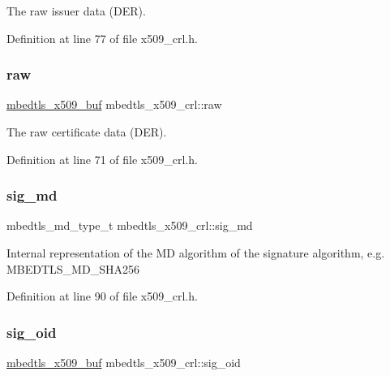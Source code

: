 The raw issuer data (D\+ER). 

Definition at line 77 of file x509\+\_\+crl.\+h.

\mbox{\label{structmbedtls__x509__crl_a6fb756d2b65237ccaff6061f4217b2eb}} 
\subsubsection{\texorpdfstring{raw}{raw}}
{\footnotesize\ttfamily \mbox{\hyperlink{group__x509__module_ga4d02c9e8e4e2934555e0d132cd2976dc}{mbedtls\+\_\+x509\+\_\+buf}} mbedtls\+\_\+x509\+\_\+crl\+::raw}

The raw certificate data (D\+ER). 

Definition at line 71 of file x509\+\_\+crl.\+h.

\mbox{\label{structmbedtls__x509__crl_a85c03124f3b4a2afe8b5c47fab13a8a9}} 
\subsubsection{\texorpdfstring{sig\+\_\+md}{sig\_md}}
{\footnotesize\ttfamily mbedtls\+\_\+md\+\_\+type\+\_\+t mbedtls\+\_\+x509\+\_\+crl\+::sig\+\_\+md}

Internal representation of the MD algorithm of the signature algorithm, e.\+g. M\+B\+E\+D\+T\+L\+S\+\_\+\+M\+D\+\_\+\+S\+H\+A256 

Definition at line 90 of file x509\+\_\+crl.\+h.

\mbox{\label{structmbedtls__x509__crl_ad21b69052f214be907ceb84a9274b9f2}} 
\subsubsection{\texorpdfstring{sig\+\_\+oid}{sig\_oid}}
{\footnotesize\ttfamily \mbox{\hyperlink{group__x509__module_ga4d02c9e8e4e2934555e0d132cd2976dc}{mbedtls\+\_\+x509\+\_\+buf}} mbedtls\+\_\+x509\+\_\+crl\+::sig\+\_\+oid}

